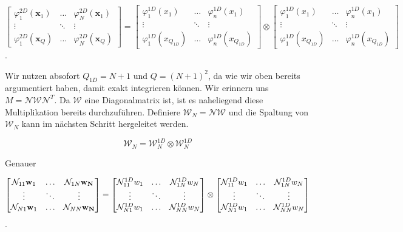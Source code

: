 \begin{equation*}
\begin{bmatrix}
\varphi^{2D}_1(\bm{x}_1) & \hdots & \varphi^{2D}_N(\bm{x}_1) \\
\vdots & \ddots & \vdots \\
\varphi^{2D}_1(\bm{x}_Q) & \hdots & \varphi^{2D}_N(\bm{x}_Q)
\end{bmatrix}
=
\begin{bmatrix}
\varphi^{1D}_1(x_1) & \hdots & \varphi^{1D}_n(x_1) \\
\vdots & \ddots & \vdots \\
\varphi^{1D}_1(x_{Q_{1D}}) & \hdots & \varphi^{1D}_n(x_{Q_{1D}})
\end{bmatrix}
\otimes
\begin{bmatrix}
\varphi^{1D}_1(x_1) & \hdots & \varphi^{1D}_n(x_1) \\
\vdots & \ddots & \vdots \\
\varphi^{1D}_1(x_{Q_{1D}}) & \hdots & \varphi^{1D}_n(x_{Q_{1D}})
\end{bmatrix}
\end{equation*}.

Wir nutzen absofort $Q_{1D}=N+1$ und $Q=(N+1)^2$, da wie wir oben bereits argumentiert haben, damit exakt integrieren können.
Wir erinnern uns $M=\mathcal{N} \mathcal{W} \mathcal{N}^T$. Da $\mathcal{W}$ eine Diagonalmatrix ist, ist es naheliegend diese Multiplikation bereits durchzuführen. Definiere $\mathcal{W}_{N}=\mathcal{N} \mathcal{W}$ und die Spaltung von $\mathcal{W}_N$ kann im nächsten Schritt hergeleitet werden.

\begin{equation} \label{eq:weight}
\mathcal{W}_N = \mathcal{W}_N^{1D} \otimes \mathcal{W}_N^{1D}
\end{equation}

Genauer

\begin{equation*}
\begin{bmatrix}
\mathcal{N}_{11} \bold{w}_1 & \hdots & \mathcal{N}_{1N} \bold{w_N} \\
\vdots & \ddots & \vdots \\
\mathcal{N}_{N1} \bold{w}_1 & \hdots & \mathcal{N}_{NN} \bold{w_N}
\end{bmatrix}
= 
\begin{bmatrix}
\mathcal{N}_{11}^{1D} w_1 & \hdots & \mathcal{N}_{1N}^{1D} w_N \\
\vdots & \ddots & \vdots \\
\mathcal{N}_{N1}^{1D} w_1 & \hdots & \mathcal{N}_{NN}^{1D} w_N
\end{bmatrix}
\otimes
\begin{bmatrix}
\mathcal{N}_{11}^{1D} w_1 & \hdots & \mathcal{N}_{1N}^{1D} w_N \\
\vdots & \ddots & \vdots \\
\mathcal{N}_{N1}^{1D} w_1 & \hdots & \mathcal{N}_{NN}^{1D}w_N
\end{bmatrix}
\end{equation*}.

